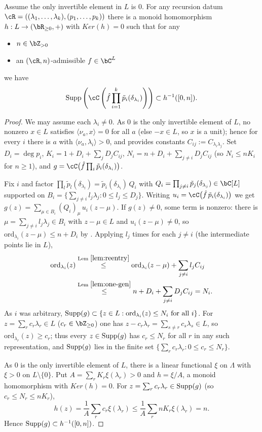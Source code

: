 \documentclass[12pt,a4paper]{amsart}%
\newcommand{\RamiB}[1]{{{#1}}}
\begin{document}
\begin{lemma}\label{lem:height}
    Assume the only invertible element in $L$ is $0$. For any recursion datum $\cR=((\lambda_1,\dots,\lambda_k),(p_1,\dots,p_k))$ there is a monoid homomorphism $h:L\to(\R_{\geq0},+)$ with $Ker(h)=0$ such that for any
\begin{itemize}
    \item $n\in \Z_{>0}$
    \item an $(\cR,n)$-admissible $f\in \C^L$
\end{itemize}
 we have
    $$\supp\left(\cC\left(\hat{f}\prod_{i=1}^k \tilde p_i(\delta_{\lambda_i})\right)\right)\subset h^{-1}([0,n]).$$
\end{lemma}
 \begin{proof}
 We may assume each $\lambda_i\neq0$. As $0$ is the only invertible element of $L$, no nonzero $x\in L$ satisfies $\langle\nu_a,x\rangle=0$ for all $a$ (else $-x\in L$, so $x$ is a unit); hence for every $i$ there is $a$ with $\langle\nu_a,\lambda_i\rangle>0$, and  provides constants $\RamiB{C_{ij}:=C_{\lambda_i\lambda_j}}$. Set $D_i=\deg p_i$, $K_i=1+D_i+\sum_{j}D_jC_{ij}$, $N_i=n+D_i+\sum_{j\neq i}D_jC_{ij}$ (so $N_i\leq nK_i$ for $n\geq1$), and $g=\cC\bigl(\hat f\prod_i\tilde p_i(\delta_{\lambda_i})\bigr)$.

 Fix $i$ and factor $\prod_l\tilde p_l(\delta_{\lambda_l})=\tilde p_i(\delta_{\lambda_i})\,Q_i$ with $Q_i=\prod_{j\neq i}\tilde p_j(\delta_{\lambda_j})\in\C[L]$ supported on $B_i=\{\sum_{j\neq i}l_j\lambda_j:0\leq l_j\leq D_j\}$. Writing $u_i=\cC\bigl(\hat f\,\tilde p_i(\delta_{\lambda_i})\bigr)$ we get $g(z)=\sum_{\mu\in B_i}(Q_i)_\mu\,u_i(z-\mu)$. If $g(z)\neq0$, some term is nonzero: there is $\mu=\sum_{j\neq i}l_j\lambda_j\in B_i$ with $z-\mu\in L$ and $u_i(z-\mu)\neq0$, so $\mathrm{ord}_{\lambda_i}(z-\mu)\leq n+D_i$ by . Applying  $l_j$ times for each $j\neq i$ (the intermediate points lie in $L$),
 \begin{align*}
 \mathrm{ord}_{\lambda_i}(z)&\overset{\text{Lem }\ref{lem:reentry}}{\leq}\mathrm{ord}_{\lambda_i}(z-\mu)+\sum_{j\neq i}l_jC_{ij}\\
 &\overset{\text{Lem }\ref{lem:one-gen}}{\leq} n+D_i+\sum_{j\neq i}D_jC_{ij}=N_i.
 \end{align*}
 As $i$ was arbitrary, $\operatorname{Supp}(g)\subset\{z\in L:\mathrm{ord}_{\lambda_i}(z)\leq N_i\text{ for all }i\}$. For $z=\sum_r c_r\lambda_r\in L$ ($c_r\in\Z_{\geq0}$) one has $z-c_r\lambda_r=\sum_{s\neq r}c_s\lambda_s\in L$, so $\mathrm{ord}_{\lambda_r}(z)\geq c_r$; thus every $z\in\operatorname{Supp}(g)$ has $c_r\leq N_r$ for all $r$ in any such representation, and $\operatorname{Supp}(g)$ lies in the finite set $\{\sum_r c_r\lambda_r:0\leq c_r\leq N_r\}$.

 As $0$ is the only invertible element of $L$, there is a linear functional $\xi$ on $\Lambda$ with $\xi>0$ on $L\setminus\{0\}$. Put $A=\sum_r K_r\xi(\lambda_r)>0$ and $h=\xi/A$, a monoid homomorphism with $Ker(h)=0$. For $z=\sum_r c_r\lambda_r\in\operatorname{Supp}(g)$ (so $c_r\leq N_r\leq nK_r$),
 $$h(z)=\frac1A\sum_r c_r\xi(\lambda_r)\leq\frac1A\sum_r nK_r\xi(\lambda_r)=n.$$
 Hence $\operatorname{Supp}(g)\subset h^{-1}([0,n])$.
 \end{proof}
\end{document}
